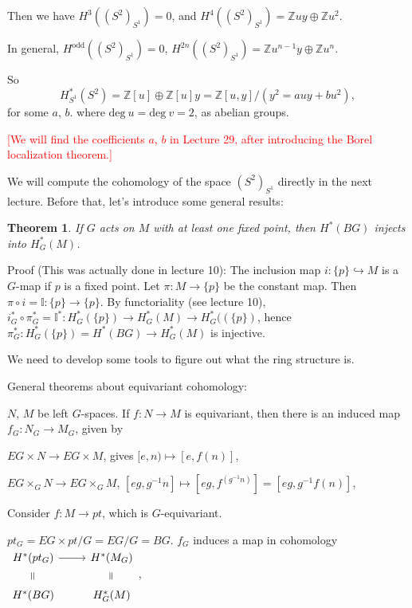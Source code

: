 \documentclass{article}
\newcommand{\verteq}{\rotatebox{90}{$\,=$}}
\theoremstyle{mystyle}
\newtheorem*{theorem*}{Theorem}
\theoremstyle{remark}
\numberwithin{equation}{section}
\begin{document}
Then we have $H^3((S^2)_{S^1})=0$, and $H^4((S^2)_{S^1})= \mathbb{Z}uy \oplus \mathbb{Z}u^2$.

In general, $H^{\text{odd}}((S^2)_{S^1}) = 0$, $H^{2n}((S^2)_{S^1}) = \mathbb{Z}u^{n-1}y\oplus \mathbb{Z}u^n$. 

So 
\begin{equation}\label{S1S2ab}
H^*_{S^1}(S^2) = \mathbb{Z}[u]\oplus \mathbb{Z}[u]y = \mathbb{Z}[u,y]/(y^2=a uy+b u^2),
\end{equation}
for some $a$, $b$. 
where $\text{deg}~u = \text{deg}~v = 2$, as abelian groups. 

\textcolor{red}{[We will find the coefficients $a$, $b$ in Lecture 29, after introducing the Borel localization theorem.]}

We will compute the cohomology of the space $(S^2)_{S^1}$ directly in the next lecture. Before that, let's introduce some general results:

\begin{theorem*} If $G$ acts on $M$ with at least one fixed point, then $H^*(BG)$ injects into $H^*_G(M)$. 
\end{theorem*}

Proof (This was actually done in lecture 10): The inclusion map $i\colon \{p\}\hookrightarrow M$ is a $G$-map if $p$ is a fixed point. Let $\pi\colon M\rightarrow \{p\}$ be the constant map. Then $\pi\circ i = \mathbb{I}\colon \{p\}\rightarrow \{p\}$. By functoriality (see lecture 10), $i^*_G\circ \pi^*_G = \mathbb{I}^*\colon H^*_G(\{p\})\rightarrow H^*_G(M)\rightarrow
H^*_G((\{p\})$, hence $\pi^*_G\colon H^*_G(\{p\}) = H^*(BG)\rightarrow H^*_G(M)$ is injective.

We need to develop some tools to figure out what the ring structure is.

General theorems about equivariant cohomology: 

 $N$, $M$ be left $G$-spaces. If $f\colon N\rightarrow M$ is equivariant, then there is an induced map $f_G\colon N_G\rightarrow M_G$, given by

$EG\times N\rightarrow EG\times M$,  gives $[e,n)\mapsto [e,f(n)]$, 

$EG\times_GN\rightarrow EG\times_GM$, $[eg,g^{-1}n] \mapsto [eg,f^(g^{-1}n)]
= [eg,g^{-1}f(n)]$,

Consider $f\colon M\rightarrow pt$, which is $G$-equivariant. 

$pt_G = EG\times pt/G = EG/G  = BG$. $f_G$ induces a map in cohomology 
$\begin{tikzcd}[row sep = -0.1pt]H^*(pt_G)\ar[r] & H^*(M_G)\\
\verteq & \verteq \\
H^*(BG) & H^*_G(M) 
\end{tikzcd}$, 
\end{document}
